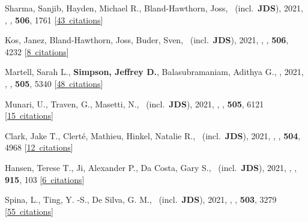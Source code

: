 \item[{\color{numcolor}\scriptsize60}] Sharma, Sanjib, Hayden, Michael R., Bland-Hawthorn, Joss, \etal\ (incl.\ \textbf{JDS}), 2021, , \mnras, \textbf{506}, 1761 [\href{https://ui.adsabs.harvard.edu/#abs/2021MNRAS.506.1761S}{43~citations}]

\item[{\color{numcolor}\scriptsize59}] Kos, Janez, Bland-Hawthorn, Joss, Buder, Sven, \etal\ (incl.\ \textbf{JDS}), 2021, , \mnras, \textbf{506}, 4232 [\href{https://ui.adsabs.harvard.edu/#abs/2021MNRAS.506.4232K}{8~citations}]

\item[{\color{numcolor}\scriptsize58}] Martell, Sarah L., \textbf{Simpson, Jeffrey D.}, Balasubramaniam, Adithya G., \etal, 2021, , \mnras, \textbf{505}, 5340 [\href{https://ui.adsabs.harvard.edu/#abs/2021MNRAS.505.5340M}{48~citations}]

\item[{\color{numcolor}\scriptsize57}] Munari, U., Traven, G., Masetti, N., \etal\ (incl.\ \textbf{JDS}), 2021, , \mnras, \textbf{505}, 6121 [\href{https://ui.adsabs.harvard.edu/#abs/2021MNRAS.505.6121M}{15~citations}]

\item[{\color{numcolor}\scriptsize56}] Clark, Jake T., Clert{\'e}, Mathieu, Hinkel, Natalie R., \etal\ (incl.\ \textbf{JDS}), 2021, , \mnras, \textbf{504}, 4968 [\href{https://ui.adsabs.harvard.edu/#abs/2021MNRAS.504.4968C}{12~citations}]

\item[{\color{numcolor}\scriptsize55}] Hansen, Terese T., Ji, Alexander P., Da Costa, Gary S., \etal\ (incl.\ \textbf{JDS}), 2021, , \apj, \textbf{915}, 103 [\href{https://ui.adsabs.harvard.edu/#abs/2021ApJ...915..103H}{6~citations}]

\item[{\color{numcolor}\scriptsize54}] Spina, L., Ting, Y. -S., De Silva, G. M., \etal\ (incl.\ \textbf{JDS}), 2021, , \mnras, \textbf{503}, 3279 [\href{https://ui.adsabs.harvard.edu/#abs/2021MNRAS.503.3279S}{55~citations}]

